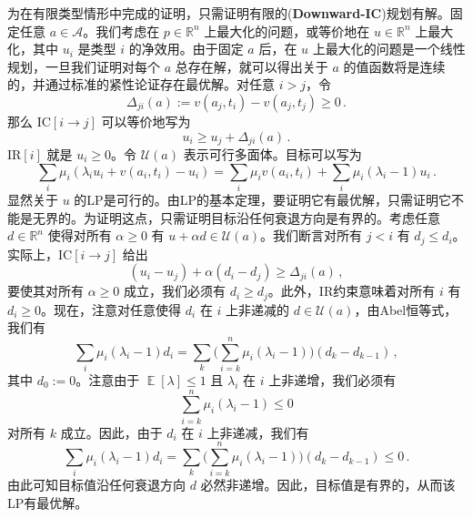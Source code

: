 \documentclass[12pt,letterpaper]{article}
\newenvironment{translation}{\color{blue}\noindent}{}
\theoremstyle{plain}
\theoremstyle{definition}
\theoremstyle{remark}
\DeclareMathOperator{\E}{\mathds{E}}
\newcommand{\R}{\mathds{R}}
\renewcommand{\1}{\mathds{1}}
\theoremstyle{definition}
\begin{document}
\begin{translation}
为在有限类型情形中完成的证明，只需证明有限的(\textbf{Downward-IC})规划有解。固定任意 $a \in \mathcal{A}$。我们考虑在 $p \in \R^n$ 上最大化的问题，或等价地在 $u \in \R^n$ 上最大化，其中 $u_i$ 是类型 $i$ 的净效用。由于固定 $a$ 后，在 $u$ 上最大化的问题是一个线性规划，一旦我们证明对每个 $a$ 总存在解，就可以得出关于 $a$ 的值函数将是连续的，并通过标准的紧性论证存在最优解。对任意 $i > j$，令 \[\Delta_{ji}(a) := v(a_j, t_i) - v(a_j, t_j) \geq 0\,.\]
那么 IC$[i \rightarrow j]$ 可以等价地写为
\[u_i \geq u_j + \Delta_{ji}(a)\,.\]
IR$[i]$ 就是 $u_i \geq 0$。令 $\mathcal{U}(a)$ 表示可行多面体。目标可以写为
\[\sum_i \mu_i (\lambda_i u_i + v(a_i, t_i) - u_i)  = \sum_i \mu_i v(a_i, t_i) + \sum_i \mu_i (\lambda_i- 1) u_i \,.\]
显然关于 $u$ 的LP是可行的。由LP的基本定理，要证明它有最优解，只需证明它不能是无界的。为证明这点，只需证明目标沿任何衰退方向是有界的。考虑任意 $d \in \R^n$ 使得对所有 $\alpha \geq 0$ 有 $u + \alpha d \in \mathcal{U}(a)$。我们断言对所有 $j < i$ 有 $d_j \leq d_i$。实际上，IC$[i \rightarrow j]$ 给出
\[(u_i - u_j) + \alpha (d_i - d_j) \geq \Delta_{ji}(a)\,,\]
要使其对所有 $\alpha \geq 0$ 成立，我们必须有 $d_i \geq d_j$。此外，IR约束意味着对所有 $i$ 有 $d_i \geq 0$。现在，注意对任意使得 $d_i$ 在 $i$ 上非递减的 $d \in \mathcal{U}(a)$，由Abel恒等式，我们有
\[\sum_i \mu_i (\lambda_i- 1) d_i = \sum_{k} \big(\sum_{i=k}^n \mu_i (\lambda_i- 1)\big) (d_{k} - d_{k-1})  \,,\]
其中 $d_0 := 0$。注意由于 $\E[\lambda] \leq 1$ 且 $\lambda_i$ 在 $i$ 上非递增，我们必须有
\[\sum_{i=k}^n \mu_i (\lambda_i- 1) \leq 0\]
对所有 $k$ 成立。因此，由于 $d_i$ 在 $i$ 上非递减，我们有
\[\sum_i \mu_i (\lambda_i- 1) d_i = \sum_{k} \big(\sum_{i=k}^n \mu_i (\lambda_i- 1)\big) (d_{k} - d_{k-1}) \leq 0 \,.\]
由此可知目标值沿任何衰退方向 $d$ 必然非递增。因此，目标值是有界的，从而该LP有最优解。
\end{translation}
\end{document}
